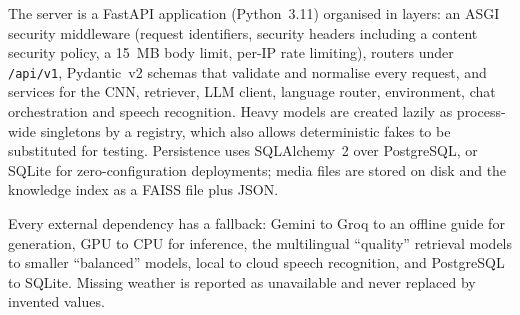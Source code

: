 The server is a FastAPI application (Python~3.11) organised in layers: an ASGI security middleware (request
identifiers, security headers including a content security policy, a 15~MB body limit, per-IP rate limiting), routers
under \texttt{/api/v1}, Pydantic~v2 schemas that validate and normalise every request, and services for the CNN,
retriever, LLM client, language router, environment, chat orchestration and speech recognition. Heavy models are
created lazily as process-wide singletons by a registry, which also allows deterministic fakes to be substituted for
testing. Persistence uses SQLAlchemy~2 over PostgreSQL, or SQLite for zero-configuration deployments; media files are
stored on disk and the knowledge index as a FAISS file plus JSON.

Every external dependency has a fallback: Gemini to Groq to an offline guide for generation, GPU to CPU for inference,
the multilingual ``quality'' retrieval models to smaller ``balanced'' models, local to cloud speech recognition, and
PostgreSQL to SQLite. Missing weather is reported as unavailable and never replaced by invented values.

